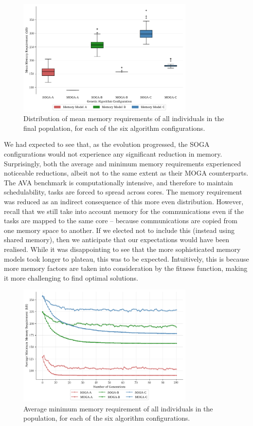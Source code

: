\documentclass[conference]{IEEEtran}
\begin{document}
\begin{figure}[!h]
  \centering
  \includegraphics*[width=8.8cm,keepaspectratio]{img/mean_memory_box}
\vspace{-4ex}
  \caption{Distribution of mean memory requirements of all individuals in the final population, for each of the six algorithm configurations.}
  \label{fig:average_memory_box}
\vspace{-2ex}
\end{figure}

We had expected to see that, as the evolution progressed, the SOGA configurations would not experience any significant reduction in memory. Surprisingly, both the average and minimum memory requirements experienced noticeable reductions, albeit not to the same extent as their MOGA counterparts. The AVA benchmark is computationally intensive, and therefore to maintain schedulability, tasks are forced to spread across cores. The memory requirement was reduced as an indirect consequence of this more even distribution. However, recall that we still take into account memory for the communications even if the tasks are mapped to the same core -- because communications are copied from one memory space to another. If we elected not to include this (instead using shared memory), then we anticipate that our expectations would have been realised. While it was disappointing to see that the more sophisticated memory models took longer to plateau, this was to be expected. Intuitively, this is because more memory factors are taken into consideration by the fitness function, making it more challenging to find optimal solutions. 

\begin{figure}[!t]
  \centering
  \includegraphics*[width=8.8cm,keepaspectratio]{img/minimum_memory_generations}
\vspace{-4ex}
  \caption{Average minimum memory requirement of all individuals in the population, for each of the six algorithm configurations.}
  \label{fig:minimum_memory_generations}
\vspace{-2ex}
\end{figure}
\end{document}
